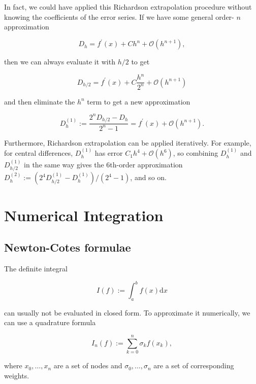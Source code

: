\begin{method}  
  In fact, we could have applied this Richardson extrapolation procedure without knowing the coefficients of the error series. If we have some general order- \(n\) approximation

\[
D_h=f^{\prime}(x)+C h^n+\mathcal{O}\left(h^{n+1}\right),
\]

then we can always evaluate it with \(h / 2\) to get

\[
D_{h / 2}=f^{\prime}(x)+C \frac{h^n}{2^n}+\mathcal{O}\left(h^{n+1}\right)
\]

and then eliminate the \(h^n\) term to get a new approximation

\[
D_h^{(1)}:=\frac{2^n D_{h / 2}-D_h}{2^n-1}=f^{\prime}(x)+\mathcal{O}\left(h^{n+1}\right) .
\]

Furthermore, Richardson extrapolation can be applied iteratively. For example, for central differences, \(D_h^{(1)}\) has error \(C_1 h^4+\mathcal{O}\left(h^6\right)\), so combining \(D_h^{(1)}\) and \(D_{h / 2}^{(1)}\) in the same way gives the 6th-order approximation \(D_h^{(2)}:=\left(2^4 D_{h / 2}^{(1)}-D_h^{(1)}\right) /\left(2^4-1\right)\), and so on.
\end{method}

\section{Numerical Integration}

\subsection{Newton-Cotes formulae}

\begin{definition}
  The definite integral

\[
I(f):=\int_a^b f(x) \mathrm{d} x
\]

can usually not be evaluated in closed form. To approximate it numerically, we can use a quadrature formula

\[
I_n(f):=\sum_{k=0}^n \sigma_k f\left(x_k\right),
\]

where \(x_0, \ldots, x_n\) are a set of nodes and \(\sigma_0, \ldots, \sigma_n\) are a set of corresponding weights.
\end{definition}

